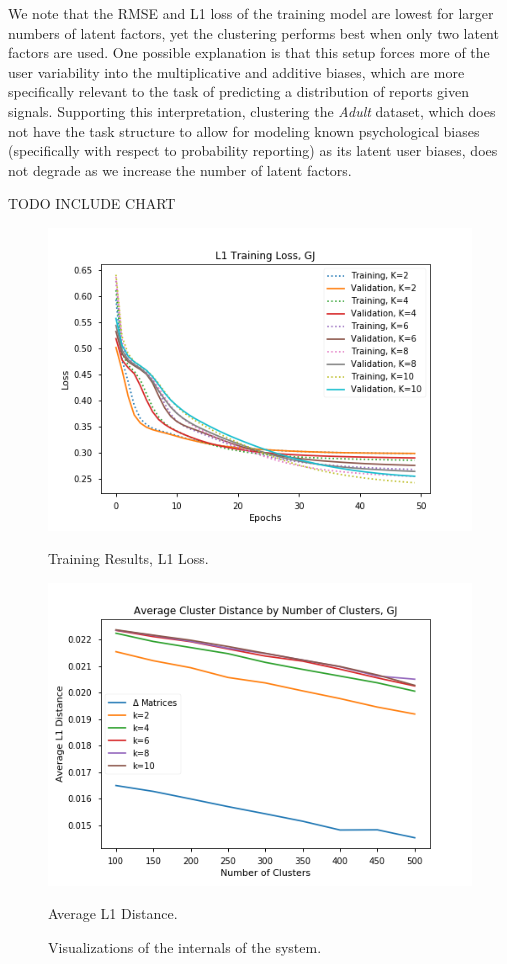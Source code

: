 \documentclass{article}
\begin{document}
We note that the RMSE and L1 loss of the training model are lowest for larger numbers of latent factors, yet the clustering performs best when only two latent factors are used. One possible explanation is that this setup forces more of the user variability into the multiplicative and additive biases, which are more specifically relevant to the task of predicting a distribution of reports given signals. Supporting this interpretation, clustering the \emph{Adult} dataset, which does not have the task structure to allow for modeling known psychological biases (specifically with respect to probability reporting) as its latent user biases, does not degrade as we increase the number of latent factors.

TODO INCLUDE CHART

\begin{figure}
  \centering
  \includegraphics[width= \columnwidth]{training.png}
  \caption{\label{fig:train} Training Results, L1 Loss.}
  \includegraphics[width= \columnwidth]{clust_dist.png}
  \caption{\label{fig:clust_dist} Average L1 Distance.}
  \missingfigure{}
  \caption{Visualizations of the internals of the system.}
\end{figure}
\end{document}
